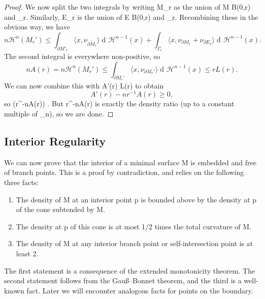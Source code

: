 \documentclass[a4paper, 11pt]{article}
\theoremstyle{plain}
\theoremstyle{definition}
\theoremstyle{remark}
\DeclareMathOperator{\diff}{d \!}
\numberwithin{equation}{subsection}
\def\({}
\def\){}
\def\pi{}
\begin{document}
\begin{proof}
We now split the two integrals by writing \(\partial M_{r}\) as the union of \(M \cap \partial B(0,r)\) and \(\Gamma_{r}\). Similarly, \(\partial E_{r}\) is the union of \(E \cap \partial B(0,r)\) and \(\Gamma_{r}\). Recombining these in the obvious way, we have
\begin{equation}
n \mathcal{H}^{n}(M_{r}') \leqslant \int_{\partial M'_{r}} \langle x, \nu_{\partial \tilde{M}_{r}} \rangle \diff \mathcal{H}^{n-1}(x) + \int_{\Gamma_{r}} \langle x, \nu_{\partial M_{r}} + \nu_{\partial E_{r}} \rangle \diff \mathcal{H}^{n-1}(x).
\end{equation}
The second integral is everywhere non-positive, so
\begin{equation}
nA(r) = n \mathcal{H}^{n}(M_{r}') \leqslant \int_{\partial M_{r}'} \langle x, \nu_{\partial M_{r}'} \rangle \diff \mathcal{H}^{n-1}(x) \leqslant rL(r).
\end{equation}
We can now combine this with \(A'(r) \geqslant L(r)\) to obtain
\begin{equation}
A'(r) - nr^{-1}A(r) \geqslant 0,
\end{equation}
so \(\frac{\!\diff}{\diff r} (r^{-n}A(r)) \). But \(r^{-n}A(r)\) is exactly the density ratio (up to a constant multiple of \(\omega_{n}\)), so we are done.
\end{proof}

\subsection{Interior Regularity}

We can now prove that the interior of a minimal surface \(M\) is embedded and free of branch points. This is a proof by contradiction, and relies on the following three facts:
\begin{enumerate}
\item The density of \(M\) at an interior point \(p\) is bounded above by the density at \(p\) of the cone subtended by \(\partial M\).
\item The density at \(p\) of this cone is at most \(1/2\pi\) times the total curvature of \(\partial M\).
\item The density of \(M\) at any interior branch point or self-intersection point is at least \(2\).
\end{enumerate}
The first statement is a consequence of the extended monotonicity theorem. The second statement follows from the Gau\ss --Bonnet theorem, and the third is a well-known fact. Later we will encounter analogous facts for points on the boundary.
\end{document}
